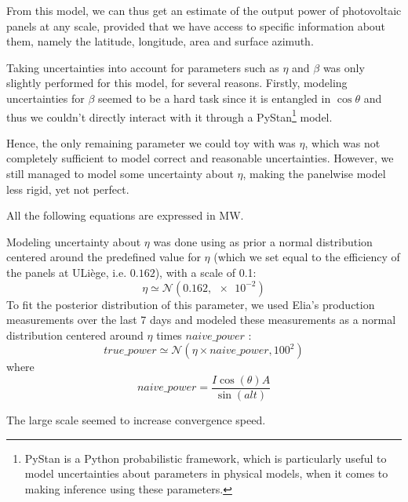 \documentclass[a4paper, 12pt]{article}
\begin{document}
From this model, we can thus get an estimate of the output power of photovoltaic panels at any scale, provided that we have access to specific information about them, namely the latitude, longitude, area and surface azimuth.

Taking uncertainties into account for parameters such as $\eta$ and $\beta$ was only slightly performed for this model, for several reasons. Firstly, modeling uncertainties for $\beta$ seemed to be a hard task since it is entangled in $\cos\theta$ and thus we couldn't directly interact with it through a PyStan\footnote{PyStan is a Python probabilistic framework, which is particularly useful to model uncertainties about parameters in physical models, when it comes to making inference using these parameters.} model. 

Hence, the only remaining parameter we could toy with was $\eta$, which was not completely sufficient to model correct and reasonable uncertainties.  However, we still managed to model some uncertainty about $\eta$, making the panelwise model less rigid, yet not perfect.

\begin{note}
    All the following equations are expressed in \si{\mega\watt}.
\end{note}
Modeling uncertainty about $\eta$ was done using as prior a normal distribution centered around the predefined value for $\eta$ (which we set equal to the efficiency of the panels at ULiège, i.e. $0.162$), with a scale of \num{0.1}:
\begin{equation*}
    \eta \simeq \mathcal{N}(0.162, \num{e-2})
\end{equation*}
To fit the posterior distribution of this parameter, we used Elia's production measurements over the last 7 days and modeled these measurements as a normal distribution centered around $\eta$ times $naive\_power$ :
\begin{equation*}
    true\_power \simeq \mathcal{N}(\eta \times naive\_power, 100^2)
\end{equation*}
where $$naive\_power = \frac{I \cos(\theta) A}{\sin(alt)}$$

The large scale seemed to increase convergence speed.
\end{document}
